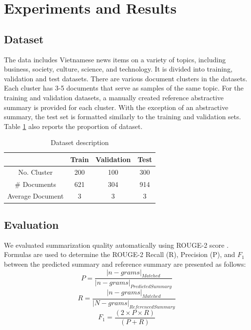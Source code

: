 \documentclass[11pt]{article}
\begin{document}
\section{Experiments and Results}

\subsection{Dataset}
The data includes Vietnamese news items on a variety of topics, including business, society, culture, science, and technology. It is divided into training, validation and test datasets. There are various document clusters in the datasets. Each cluster has 3-5 documents that serve as samples of the same topic. For the training and validation datasets, a manually created reference abstractive summary is provided for each cluster.
With the exception of an abstractive summary, the test set is formatted similarly to the training and validation sets. Table \ref{tab:dataset-stat} also reports the proportion of dataset.

\begin{table}[ht]
\centering
\caption{Dataset description}
\label{tab:dataset-stat}
\begin{tabular}{|c|c|c|c|}
\hline
                 & Train & Validation & Test \\ \hline
No. Cluster      & 200   & 100        & 300  \\
\# Documents           & 621   & 304        & 914  \\
Average Document & 3     & 3          & 3    \\ \hline
\end{tabular}
\end{table}

\subsection{Evaluation}
We evaluated summarization quality automatically using ROUGE-2 score \cite{lin2004rouge}. Formulas are used to determine the ROUGE-2 Recall (R), Precision (P), and $F_1$ between the predicted summary and reference summary are presented as follows:
\begin{equation}
    P= \frac{|n-grams|_{Matched}}{|n-grams|_{Predicted Summary}}
\end{equation}
\begin{equation}
    R=\frac{|n-grams|_{Matched}}{|N-grams|_{Referenced Summary}}
\end{equation}
\begin{equation}
    F_1=\frac{(2 \times P \times R)}{(P + R)} 
\end{equation}
\end{document}
